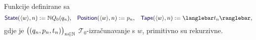 \begin{lema}[{name=[primitivna rekurzivnost $\mathcal T_0$-izračunavanja]}]\label{lm:StateHeadTapeprn}
Funkcije definirane sa
\begin{equation}
    \f{State}(\kr w,n):=\N Q_0(q_n)\text,\quad
    \f{Position}(\kr w,n):=p_n\text,\quad
    \f{Tape}(\kr w,n):=\knk{t_n}\text,
\end{equation}
gdje je $\bigl((q_n,p_n,t_n)\bigr)_{n\in{\mathbb N}}$
$\mathcal T_0$-izračunavanje s $w$,
primitivno su rekurzivne.
\end{lema}
